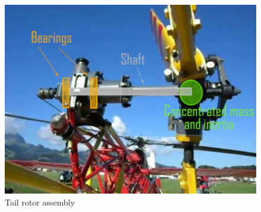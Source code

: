 \clearpage
\smallskip
\begin{figure}[h!]
	\begin{center}
		\centering  		 		
		\includegraphics[width=0.9\linewidth]{PICTURES/2_Lama_truss/PNG/model2/hqdefault2}
	\end{center}
	\caption{Tail rotor assembly}
\end{figure}	
